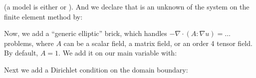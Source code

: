 \documentclass[a4paper,11pt,english]{sphinxmanual}
\begin{document}
(a model is either  or ). And we declare that  is an
unknown of the system on the finite element method  by:

\begin{sphinxVerbatim}[commandchars=\\\{\}]
 
 
    
\end{sphinxVerbatim}

Now, we add a “generic elliptic” brick, which handles \(-\nabla\cdot(A:\nabla
u) = \ldots\) problems, where \(A\) can be a scalar field, a matrix field, or
an order 4 tensor field. By default, \(A=1\). We add it on our main variable
 with:

\begin{sphinxVerbatim}[commandchars=\\\{\}]
 
    
\end{sphinxVerbatim}

Next we add a Dirichlet condition on the domain boundary:
\end{document}
